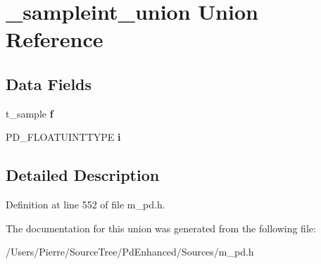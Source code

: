 \hypertarget{union__sampleint__union}{\section{\-\_\-sampleint\-\_\-union Union Reference}
\label{union__sampleint__union}
}
\subsection*{Data Fields}
\begin{DoxyCompactItemize}
\item 
\hypertarget{union__sampleint__union_a3b27de018058e7941a2f36d7a28c2cda}{t\-\_\-sample {\bfseries f}}\label{union__sampleint__union_a3b27de018058e7941a2f36d7a28c2cda}

\item 
\hypertarget{union__sampleint__union_adf26f258fed88b899f79b9694af64f84}{P\-D\-\_\-\-F\-L\-O\-A\-T\-U\-I\-N\-T\-T\-Y\-P\-E {\bfseries i}}\label{union__sampleint__union_adf26f258fed88b899f79b9694af64f84}

\end{DoxyCompactItemize}


\subsection{Detailed Description}


Definition at line 552 of file m\-\_\-pd.\-h.



The documentation for this union was generated from the following file\-:\begin{DoxyCompactItemize}
\item 
/\-Users/\-Pierre/\-Source\-Tree/\-Pd\-Enhanced/\-Sources/m\-\_\-pd.\-h\end{DoxyCompactItemize}
